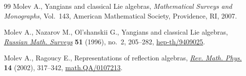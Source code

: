 \documentclass[11pt]{article}
\begin{document}
\begin{thebibliography}{99}
Molev A.,
Yangians and classical Lie algebras,
 {\it Mathematical Surveys and Monographs},  Vol.~143, American Mathematical Society, Providence, RI, 2007.

Molev A., Nazarov M., Ol'shanskii G.,
Yangians and classical Lie algebras,
\href{http://dx.doi.org/10.1070/RM1996v051n02ABEH002772}{{\it Russian Math. Surveys}} \textbf{51}   (1996), no.~2, 205--282,
\href{http://arxiv.org/abs/hep-th/9409025}{hep-th/9409025}.

 Molev A., Ragoucy E.,
Representations of ref\/lection algebras,
\href{http://dx.doi.org/10.1142/S0129055X02001156}{{\it Rev. Math. Phys.}} \textbf{14} (2002),  317--342,
\href{http://arxiv.org/abs/math.QA/0107213}{math.QA/0107213}.

 \end{thebibliography}
\end{document}
